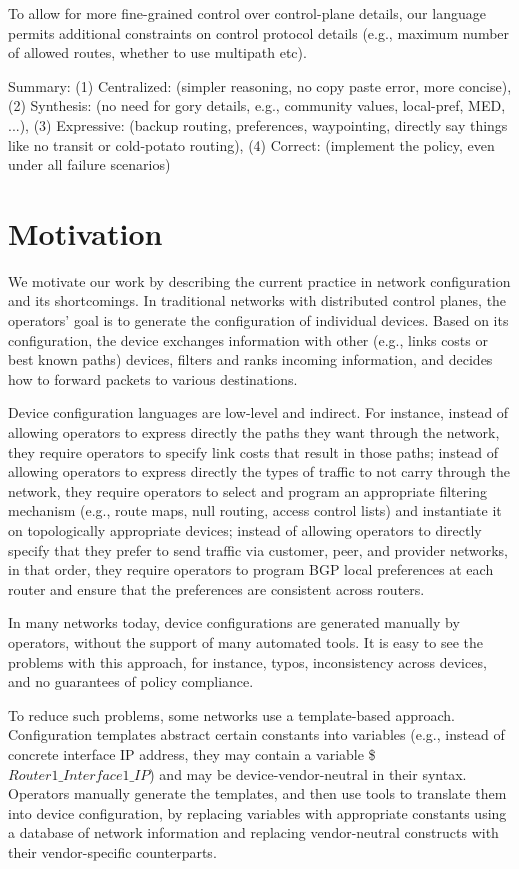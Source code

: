 \documentclass{paper}
\begin{document}
To allow for more fine-grained control over control-plane details, our language permits additional constraints on control protocol details (e.g., maximum number of allowed routes, whether to use multipath etc).


Summary:
	 (1) Centralized: (simpler reasoning, no copy paste error, more concise),
	 (2) Synthesis: (no need for gory details, e.g., community values, local-pref, MED, ...),
	 (3) Expressive: (backup routing, preferences, waypointing, directly say things like no transit or cold-potato routing),
	 (4) Correct: (implement the policy, even under all failure scenarios)


\section{Motivation}
\label{sec:motivation}

We motivate our work by describing the current practice in network configuration and its shortcomings.
In traditional networks with distributed control planes, the operators’ goal is to generate the configuration of individual devices. Based on its configuration, the device exchanges information with other (e.g., links costs or best known paths) devices, filters and ranks incoming information, and decides how to forward packets to various destinations.

Device configuration languages are low-level and indirect. For instance, instead of allowing operators to express directly the paths they want through the network, they require operators to specify link costs that result in those paths; instead of allowing operators to express directly the types of traffic to not carry through the network, they require operators to select and program an appropriate filtering mechanism (e.g., route maps, null routing,  access control lists) and instantiate it on topologically appropriate devices; instead of allowing operators to directly specify that they prefer to send traffic via customer, peer, and provider networks, in that order, they require operators to program BGP local preferences at each router and ensure that the preferences are consistent across routers.

In many networks today, device configurations are generated manually by operators, without the support of many automated tools. It is easy to see the problems with this approach, for instance, typos, inconsistency across devices, and no guarantees of policy compliance.

To reduce such problems, some networks use a template-based approach. Configuration templates abstract certain constants into variables (e.g., instead of concrete interface IP address, they may contain a variable \$$Router1\_Interface1\_IP$) and may be device-vendor-neutral in their syntax. Operators manually generate the templates, and then use tools to translate them into device configuration, by replacing variables with appropriate constants using a database of network information and replacing vendor-neutral constructs with their vendor-specific counterparts.  
\end{document}
